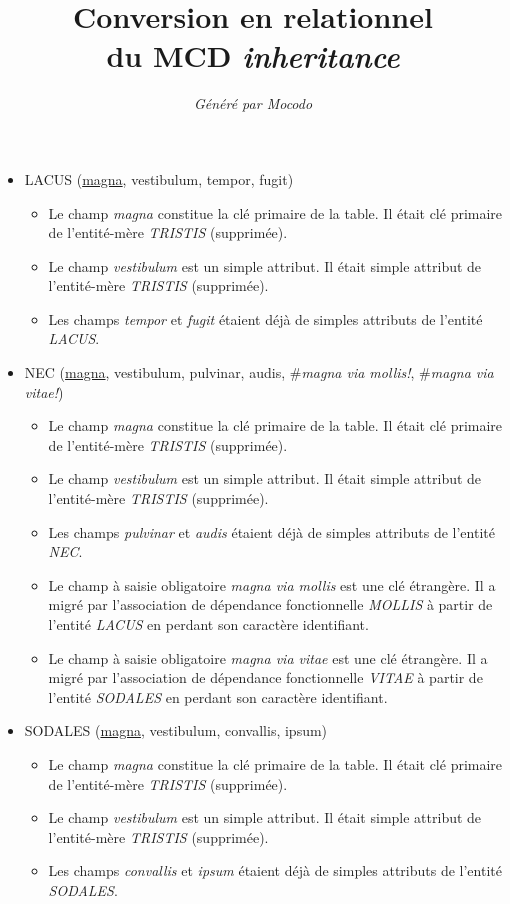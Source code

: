\documentclass[a4paper]{article}
\title{Conversion en relationnel\\du MCD \emph{inheritance}}
\author{\emph{Généré par Mocodo}}
\newcommand{\relat}[1]{\textsc{#1}}
\newcommand{\attr}[1]{#1}
\newcommand{\prim}[1]{\uline{#1}}
\newcommand{\foreign}[1]{\#\textsl{#1}}
\begin{document}
\maketitle

\begin{itemize}
  \item \relat{LACUS} (\prim{magna}, \attr{vestibulum}, \attr{tempor}, \attr{fugit})
  \begin{itemize}
    \item Le champ \emph{magna} constitue la clé primaire de la table. Il était clé primaire de l'entité-mère \emph{TRISTIS} (supprimée).
    \item Le champ \emph{vestibulum} est un simple attribut. Il était simple attribut de l'entité-mère \emph{TRISTIS} (supprimée).
    \item Les champs \emph{tempor} et \emph{fugit} étaient déjà de simples attributs de l'entité \emph{LACUS}.
  \end{itemize}

  \item \relat{NEC} (\prim{magna}, \attr{vestibulum}, \attr{pulvinar}, \attr{audis}, \foreign{magna via mollis!}, \foreign{magna via vitae!})
  \begin{itemize}
    \item Le champ \emph{magna} constitue la clé primaire de la table. Il était clé primaire de l'entité-mère \emph{TRISTIS} (supprimée).
    \item Le champ \emph{vestibulum} est un simple attribut. Il était simple attribut de l'entité-mère \emph{TRISTIS} (supprimée).
    \item Les champs \emph{pulvinar} et \emph{audis} étaient déjà de simples attributs de l'entité \emph{NEC}.
    \item Le champ à saisie obligatoire \emph{magna via mollis} est une clé étrangère. Il a migré par l'association de dépendance fonctionnelle \emph{MOLLIS} à partir de l'entité \emph{LACUS} en perdant son caractère identifiant.
    \item Le champ à saisie obligatoire \emph{magna via vitae} est une clé étrangère. Il a migré par l'association de dépendance fonctionnelle \emph{VITAE} à partir de l'entité \emph{SODALES} en perdant son caractère identifiant.
  \end{itemize}

  \item \relat{SODALES} (\prim{magna}, \attr{vestibulum}, \attr{convallis}, \attr{ipsum})
  \begin{itemize}
    \item Le champ \emph{magna} constitue la clé primaire de la table. Il était clé primaire de l'entité-mère \emph{TRISTIS} (supprimée).
    \item Le champ \emph{vestibulum} est un simple attribut. Il était simple attribut de l'entité-mère \emph{TRISTIS} (supprimée).
    \item Les champs \emph{convallis} et \emph{ipsum} étaient déjà de simples attributs de l'entité \emph{SODALES}.
  \end{itemize}


\end{itemize}
\end{document}
